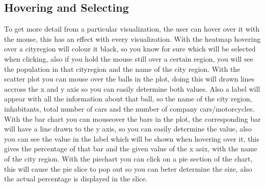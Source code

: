 \documentclass[a4paper,twoside,11pt]{article}
\begin{document}
\subsection{Hovering and Selecting}
To get more detail from a particular visualization, the user can hover over it with the mouse, this has an effect with every visualization. \newline
With the heatmap hovering over a cityregion will colour it black, so you know for sure which will be selected when clicking, also if you hold the mouse still over a certain region, you will see the population in that cityregion and the name of the city region. \newline
With the scatter plot you can mouse over the balls in the plot, doing this will drawn lines accross the x and y axis so you can easily determine both values. Also a label will appear with all the information about that ball, so the name of the city region, inhabitants, total number of cars and the number of company cars/motorcycles. \newline
With the bar chart you can mouseover the bars in the plot, the corresponding bar will have a line drawn to the y axis, so you can easily determine the value, also you can see the value in the label which will be shown when hovering over it, this gives the percentage of that bar and the given value of the x asix, with the name of the city region. \newline
With the piechart you can click on a pie section of the chart, this will cause the pie slice to pop out so you can beter determine the size, also the actual percentage is displayed in the slice. \newline
\end{document}
